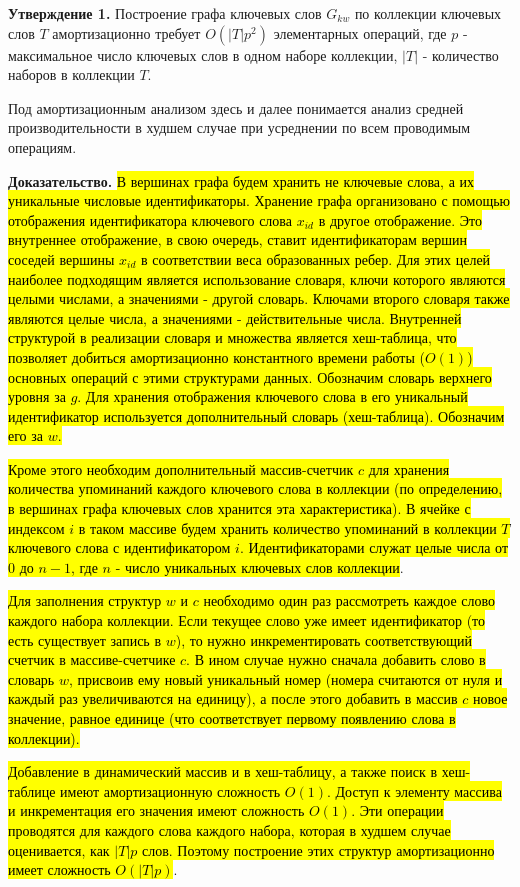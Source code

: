 \textbf{Утверждение 1.} Построение графа ключевых слов $G_{kw}$ по коллекции ключевых слов $T$ амортизационно  требует $O(|T|p^2)$ элементарных операций, где $p$ - максимальное число ключевых слов в одном наборе коллекции, $|T|$ - количество наборов в коллекции $T$.

Под амортизационным анализом здесь и далее понимается анализ средней производительности в худшем случае при усреднении по всем проводимым операциям.

\textbf{Доказательство.} 
\hl{В вершинах графа будем хранить не ключевые слова, а их уникальные числовые идентификаторы. Хранение графа организовано с помощью отображения идентификатора ключевого слова $x_{id}$ в другое отображение. Это внутреннее отображение, в свою очередь, ставит идентификаторам вершин соседей вершины $x_{id}$ в соответствии веса образованных ребер. Для этих целей наиболее подходящим является использование словаря, ключи которого являются целыми числами, а значениями - другой словарь. Ключами второго словаря также являются целые числа, а значениями - действительные числа. Внутренней структурой в реализации словаря и множества является хеш-таблица, что позволяет добиться амортизационно константного времени работы ($O(1)$) основных операций с этими структурами данных. Обозначим словарь верхнего уровня за $g$. Для хранения отображения ключевого слова в его уникальный идентификатор используется дополнительный словарь (хеш-таблица). Обозначим его за $w$.}

\hl{Кроме этого необходим дополнительный массив-счетчик $c$ для хранения количества упоминаний каждого ключевого слова в коллекции (по определению, в вершинах графа ключевых слов хранится эта характеристика). В ячейке с индексом $i$ в таком массиве будем хранить количество упоминаний в коллекции $T$ ключевого слова с идентификатором $i$. Идентификаторами служат целые числа от 0 до $n - 1$, где $n$ - число уникальных ключевых слов коллекции}.

\hl{Для заполнения структур $w$ и $c$ необходимо один раз рассмотреть каждое слово каждого набора коллекции. Если текущее слово уже имеет идентификатор (то есть существует запись в $w$), то нужно инкрементировать соответствующий счетчик в массиве-счетчике $c$. В ином случае нужно сначала добавить слово в словарь $w$, присвоив ему новый уникальный номер (номера считаются от нуля и каждый раз увеличиваются на единицу), а после этого добавить в массив $c$ новое значение, равное единице (что соответствует первому появлению слова в коллекции).}

\hl{Добавление в динамический массив и в хеш-таблицу, а также поиск в хеш-таблице  имеют амортизационную сложность $O(1)$. Доступ к элементу массива и инкрементация его значения имеют сложность $O(1)$. Эти операции проводятся для каждого слова каждого набора, которая в худшем случае оценивается, как $|T|p$ слов. Поэтому построение этих структур амортизационно имеет сложность $O(|T|p)$}.

